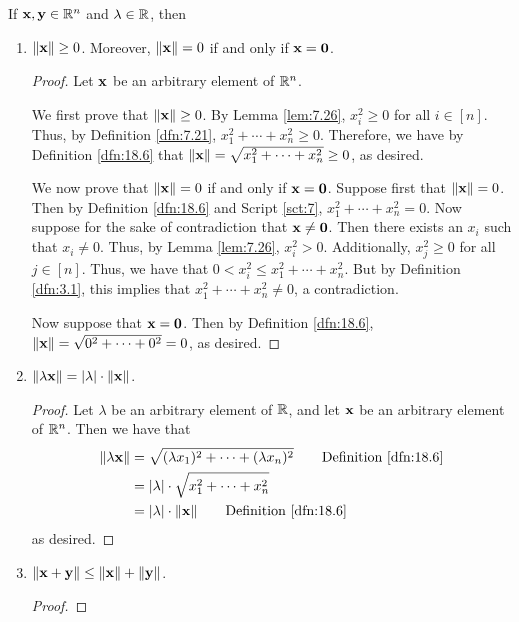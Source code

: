 \documentclass[../main.tex]{subfiles}
\begin{document}
\begin{theorem}\label{trm:18.10}
    If $\mathbf{x},\mathbf{y}\in\mathbb{R}^n$ and $\lambda\in\mathbb{R}$, then
    \begin{enumerate}[label=\textup{(}\alph*\textup{)}]
        \item $\norm{\mathbf{x}}\geq 0$. Moreover, $\norm{\mathbf{x}}=0$ if and only if $\mathbf{x}=\bm{0}$.
        \begin{proof}
            Let $\mathbf{x}$ be an arbitrary element of $\mathbb{R}^n$.\par\smallskip
            We first prove that $\norm{\mathbf{x}}\geq 0$. By Lemma \ref{lem:7.26}, $x_i^2\geq 0$ for all $i\in[n]$. Thus, by Definition \ref{dfn:7.21}, $x_1^2+\cdots+x_n^2\geq 0$. Therefore, we have by Definition \ref{dfn:18.6} that $\norm{\mathbf{x}}=\sqrt{x_1^2+\cdots+x_n^2}\geq 0$, as desired.\par\smallskip
            We now prove that $\norm{\mathbf{x}}=0$ if and only if $\mathbf{x}=\bm{0}$. Suppose first that $\norm{\mathbf{x}}=0$. Then by Definition \ref{dfn:18.6} and Script \ref{sct:7}, $x_1^2+\cdots+x_n^2=0$. Now suppose for the sake of contradiction that $\mathbf{x}\neq\bm{0}$. Then there exists an $x_i$ such that $x_i\neq 0$. Thus, by Lemma \ref{lem:7.26}, $x_i^2>0$. Additionally, $x_j^2\geq 0$ for all $j\in[n]$. Thus, we have that $0<x_i^2\leq x_1^2+\cdots+x_n^2$. But by Definition \ref{dfn:3.1}, this implies that $x_1^2+\cdots+x_n^2\neq 0$, a contradiction.\par
            Now suppose that $\mathbf{x}=\bm{0}$. Then by Definition \ref{dfn:18.6}, $\norm{\mathbf{x}}=\sqrt{0^2+\cdots+0^2}=0$, as desired.
        \end{proof}
        \item $\norm{\lambda\mathbf{x}}=|\lambda|\cdot\norm{\mathbf{x}}$.
        \begin{proof}
            Let $\lambda$ be an arbitrary element of $\mathbb{R}$, and let $\mathbf{x}$ be an arbitrary element of $\mathbb{R}^n$. Then we have that
            \begin{align*}
                \norm{\lambda\x} &= \sqrt{(\lambda x_1)^2+\cdots+(\lambda x_n)^2}\tag*{Definition \ref{dfn:18.6}}\\
                &= |\lambda|\cdot\sqrt{x_1^2+\cdots+x_n^2}\\
                &= |\lambda|\cdot\norm{\x}\tag*{Definition \ref{dfn:18.6}}
            \end{align*}
            as desired.
        \end{proof}
        \item $\norm{\mathbf{x}+\mathbf{y}}\leq\norm{\mathbf{x}}+\norm{\mathbf{y}}$.
        \begin{proof}

\end{proof}
\end{enumerate}
\end{theorem}
\end{document}
